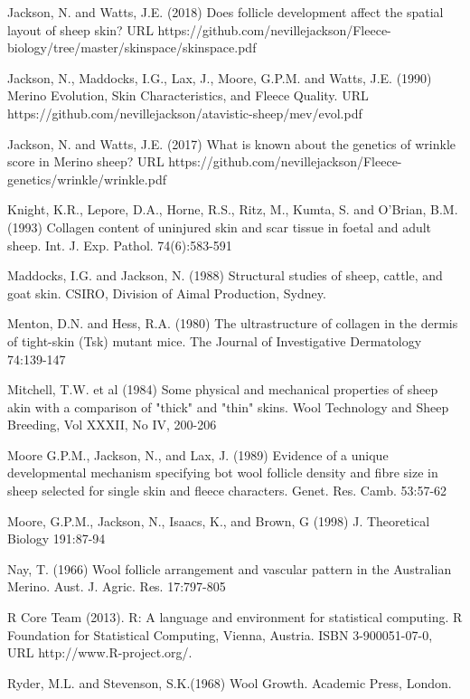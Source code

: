 \documentclass[titlepage]{article}  %
\begin{document}
\begin{thebibliography}{99}
Jackson, N. and Watts, J.E. (2018) Does follicle development affect the spatial layout of sheep skin? URL https://github.com/nevillejackson/Fleece-biology/tree/master/skinspace/skinspace.pdf

Jackson, N., Maddocks, I.G., Lax, J., Moore, G.P.M. and Watts, J.E. (1990) Merino Evolution, Skin Characteristics, and Fleece Quality. URL https://github.com/nevillejackson/atavistic-sheep/mev/evol.pdf 

Jackson, N. and Watts, J.E. (2017) What is known about the genetics of wrinkle score in Merino sheep? URL https://github.com/nevillejackson/Fleece-genetics/wrinkle/wrinkle.pdf

Knight, K.R., Lepore, D.A., Horne, R.S., Ritz, M., Kumta, S. and O'Brian, B.M. (1993) Collagen content of uninjured skin and scar tissue in foetal and adult sheep. Int. J. Exp. Pathol. 74(6):583-591

Maddocks, I.G. and Jackson, N. (1988) Structural studies of sheep, cattle, and goat skin. CSIRO, Division of Aimal Production, Sydney.

Menton, D.N. and Hess, R.A. (1980) The ultrastructure of collagen in the dermis of tight-skin (Tsk) mutant mice. The Journal of Investigative Dermatology 74:139-147

Mitchell, T.W. et al (1984) Some physical and mechanical properties of sheep akin with a comparison of "thick" and "thin" skins. Wool Technology and Sheep Breeding, Vol XXXII, No IV, 200-206

Moore G.P.M., Jackson, N., and Lax, J. (1989) Evidence of a unique developmental mechanism specifying bot wool follicle density and fibre size in sheep selected for single skin and fleece characters. Genet. Res. Camb. 53:57-62

Moore, G.P.M., Jackson, N., Isaacs, K., and Brown, G (1998) J. Theoretical Biology 191:87-94

Nay, T. (1966) Wool follicle arrangement and vascular pattern in the Australian Merino. Aust. J. Agric. Res. 17:797-805

R Core Team (2013). R: A language and environment for statistical
  computing. R Foundation for Statistical Computing, Vienna, Austria.
  ISBN 3-900051-07-0, URL http://www.R-project.org/.

Ryder, M.L. and Stevenson, S.K.(1968) Wool Growth. Academic Press, London.



\end{thebibliography}
\end{document}
